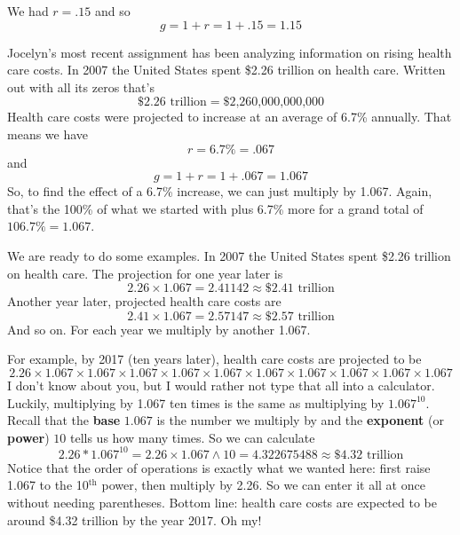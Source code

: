  \noindent We had $r=.15$ and so $$g=1+r=1+.15=1.15$$

Jocelyn's most recent assignment has been analyzing information on rising health care costs.  In 2007 the United States spent \$2.26 trillion on health care. 
Written out with all its zeros that's $$\$2.26 \text{ trillion} =  \text{\$2,260,000,000,000}$$
Health care costs were projected to increase at an average of 6.7\% annually.
That means we have
$$r= 6.7\% = .067$$ and $$g=1+r=1+.067=1.067$$  So, to find the effect of a 6.7\% increase, we can just multiply by 1.067.  Again, that's the 100\% of what we started with plus 6.7\% more for a grand total of $106.7\%= 1.067$.
  
We are ready to do some examples.  In 2007 the United States spent \$2.26 trillion on health care.  The projection for one year later is
$$2.26 \times 1.067 = 2.41142 \approx \$2.41 \text{ trillion}$$  
Another year later, projected health care costs are
$$2.41  \times 1.067 = 2.57147 \approx \$2.57 \text{ trillion}$$  
And so on.  For each year we multiply by another 1.067.  

For example, by 2017 (ten years later), health care costs are projected to be
$$2.26 \times 1.067  \times 1.067  \times 1.067  \times 1.067  \times 1.067  \times 1.067  \times 1.067  \times 1.067  \times 1.067  \times 1.067 $$
I don't know about you, but I would rather not type that all into a calculator.  Luckily, multiplying by 1.067 ten times is the same as multiplying by $1.067^{10}$.  Recall that the  \textbf{base} $1.067$ is the number we multiply by and the \textbf{exponent} (or \textbf{power}) $10$ tells us how many times.  So we can calculate 
$$2.26  \ast 1.067^{10} = 2.26 \times 1.067 \wedge 10  
= 4.322675488 \approx \$ 4.32 \text{ trillion}$$ 
Notice that the order of operations is exactly what we wanted here:  first raise 1.067 to the 10$^{\text{th}}$ power, then multiply by 2.26.  So we can enter it all at once without needing parentheses.
Bottom line: health care costs are expected to be around \$4.32 trillion by the year 2017.  Oh my! 

